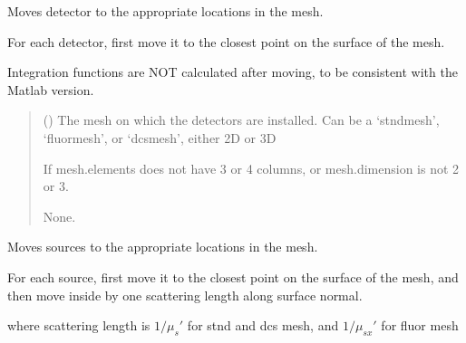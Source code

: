 \documentclass[letterpaper,10pt,english]{sphinxmanual}
\begin{document}
\begin{fulllineitems}
\begin{fulllineitems}
\label{\detokenize{_autosummary/nirfasterff.base.optodes.optode:nirfasterff.base.optodes.optode.move_detectors}}
\pysigstartsignatures
\pysiglinewithargsret
{}
{}
{}
\pysigstopsignatures
\sphinxAtStartPar
Moves detector to the appropriate locations in the mesh.

\sphinxAtStartPar
For each detector, first move it to the closest point on the surface of the mesh.

\sphinxAtStartPar
Integration functions are NOT calculated after moving, to be consistent with the Matlab version.
\begin{quote}\begin{description}
\sphinxAtStartPar
{} () \textendash{} The mesh on which the detectors are installed. Can be a ‘stndmesh’, ‘fluormesh’, or ‘dcsmesh’, either 2D or 3D

\sphinxAtStartPar
{} \textendash{} If mesh.elements does not have 3 or 4 columns, or mesh.dimension is not 2 or 3.

\sphinxAtStartPar
None.

\end{description}\end{quote}

\end{fulllineitems}


\begin{fulllineitems}
\label{\detokenize{_autosummary/nirfasterff.base.optodes.optode:nirfasterff.base.optodes.optode.move_sources}}
\pysigstartsignatures
\pysiglinewithargsret
{}
{}
{}
\pysigstopsignatures
\sphinxAtStartPar
Moves sources to the appropriate locations in the mesh.

\sphinxAtStartPar
For each source, first move it to the closest point on the surface of the mesh, and then move inside by one scattering length along surface normal.

\sphinxAtStartPar
where scattering length is \(1/\mu_s'\) for stnd and dcs mesh, and \(1/\mu_{sx}'\) for fluor mesh


\end{fulllineitems}
\end{fulllineitems}
\end{document}
